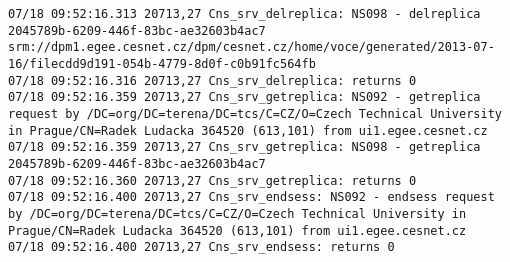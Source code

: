 \documentclass[a4paper, 11pt]{article} %
\begin{document}
\begin{lstlisting}[label={log:del1},caption={lcg-del --vo voce srm://dpm1.egee.cesnet.cz/dpm/cesnet.cz/home/voce/generated/2013-07-16/filecdd9d191-054b-4779-8d0f-c0b91fc564fb - delete only one replica}]
07/18 09:52:16.313 20713,27 Cns_srv_delreplica: NS098 - delreplica 2045789b-6209-446f-83bc-ae32603b4ac7 srm://dpm1.egee.cesnet.cz/dpm/cesnet.cz/home/voce/generated/2013-07-16/filecdd9d191-054b-4779-8d0f-c0b91fc564fb
07/18 09:52:16.316 20713,27 Cns_srv_delreplica: returns 0
07/18 09:52:16.359 20713,27 Cns_srv_getreplica: NS092 - getreplica request by /DC=org/DC=terena/DC=tcs/C=CZ/O=Czech Technical University in Prague/CN=Radek Ludacka 364520 (613,101) from ui1.egee.cesnet.cz
07/18 09:52:16.359 20713,27 Cns_srv_getreplica: NS098 - getreplica  2045789b-6209-446f-83bc-ae32603b4ac7
07/18 09:52:16.360 20713,27 Cns_srv_getreplica: returns 0
07/18 09:52:16.400 20713,27 Cns_srv_endsess: NS092 - endsess request by /DC=org/DC=terena/DC=tcs/C=CZ/O=Czech Technical University in Prague/CN=Radek Ludacka 364520 (613,101) from ui1.egee.cesnet.cz
07/18 09:52:16.400 20713,27 Cns_srv_endsess: returns 0
\end{lstlisting}
\end{document}
